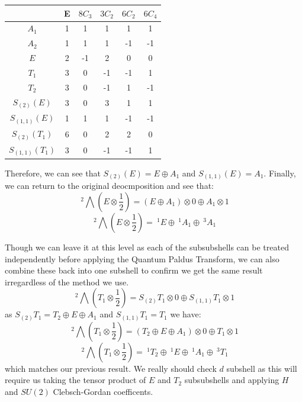\documentclass{article}
\begin{document}
\begin{tabular}{|c|c|c|c|c|c|}\hline
& E&$8C_3$&$3C_2$&$6C_2$&$6C_4$\\\hline
$A_1$& 1&1&1&1&1\\\hline
$A_2$& 1&1&1&-1&-1\\\hline
$E$& 2&-1&2&0&0\\\hline
$T_1$& 3&0&-1&-1&1\\\hline
$T_2$& 3&0&-1&1&-1\\\hline
$S_{(2)}(E)$& 3&0&3&1&1\\\hline
$S_{(1,1)}(E)$& 1&1&1&-1&-1\\\hline
$S_{(2)}(T_1)$& 6&0&2&2&0\\\hline
$S_{(1,1)}(T_1)$& 3&0&-1&-1&1\\\hline
\end{tabular}

Therefore, we can see that $S_{(2)}(E) = E \oplus A_1$ and $S_{(1,1)}(E) = A_1$. Finally, we can return to the original deocmposition and see that:
\begin{equation}
    \>^2\bigwedge (E\otimes \frac{1}{2}) = (E\oplus A_1) \otimes 0 \oplus A_1 \otimes 1
\end{equation}
\begin{equation}
    \>^2\bigwedge (E\otimes \frac{1}{2}) = \>^1E \oplus \>^1A_1\oplus \>^3A_1
\end{equation}

Though we can leave it at this level as each of the subsubshells can be treated independently before applying the Quantum Paldus Transform, we can also combine these back into one subshell to confirm we get the same result irregardless of the method we use.
\begin{equation}
    \>^2\bigwedge (T_1\otimes \frac{1}{2}) = S_{(2)} T_1 \otimes 0 \oplus S_{(1,1)} T_1 \otimes 1
\end{equation}
as $S_{(2)}T_1 = T_2 \oplus E \oplus A_1$ and $S_{(1,1)}T_1 = T_1$ we have:
\begin{equation}
    \>^2\bigwedge (T_1\otimes \frac{1}{2}) = (T_2 \oplus E \oplus A_1) \otimes 0 \oplus T_1 \otimes 1
\end{equation}
\begin{equation}
    \>^2\bigwedge (T_1\otimes \frac{1}{2}) = \>^1T_2 \oplus \>^1E \oplus \>^1A_1 \oplus \>^3T_1
\end{equation}
which matches our previous result. We really should check $d$ subshell as this will require us taking the tensor product of $E$ and $T_2$ subsubshells and applying $H$  and $SU(2)$ Clebsch-Gordan coefficents.
\end{document}
